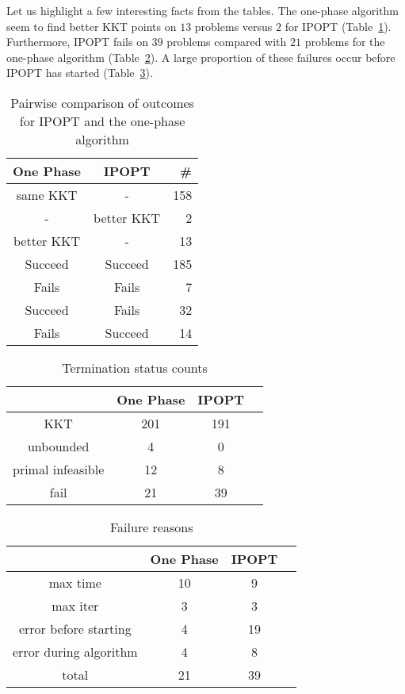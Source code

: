 \documentclass{article}
\begin{document}
Let us highlight a few interesting facts from the tables. The one-phase algorithm seem to find better KKT points on $13$ problems versus $2$ for IPOPT (Table~\ref{tbl:pairwise-outcomes}). Furthermore, IPOPT fails on $39$ problems compared with $21$ problems for the one-phase algorithm (Table~\ref{tbl:termination-status-counts}). A large proportion of these failures occur before IPOPT has started (Table~\ref{tbl:failure-reasons}).

\begin{table}[H]
\caption{Pairwise comparison of outcomes for IPOPT and the one-phase algorithm}\label{tbl:pairwise-outcomes}
\begin{tabular}{ c c r }
  One Phase &  IPOPT &  \# \\
  \hline
same KKT & - & 158  \\
- & better KKT & 2 \\
better KKT & - &  13 \\
\hline
Succeed & Succeed & 185 \\
Fails & Fails & 7 \\
Succeed & Fails &  32 \\
Fails & Succeed & 14 \\
\end{tabular}
\end{table}


\begin{table}[H]
\caption{Termination status counts}\label{tbl:termination-status-counts}
\begin{tabular}{ c c c r }
 &  One Phase &  IPOPT &  \\
  \hline
KKT &  201 & 191 \\
unbounded & 4 & 0  \\
primal infeasible & 12 &  8 \\
fail & 21 & 39 \\
\end{tabular}
\end{table}

\begin{table}[H]
\caption{Failure reasons}\label{tbl:failure-reasons}
\begin{tabular}{ c c c r }
 &  One Phase & IPOPT \\
  \hline
max time & 10 & 9  \\
max iter &  3 & 3 \\
error before starting & 4 & 19 \\
error during algorithm & 4 & 8 \\
\hline
total & 21 & 39
\end{tabular}
\end{table}
\end{document}
